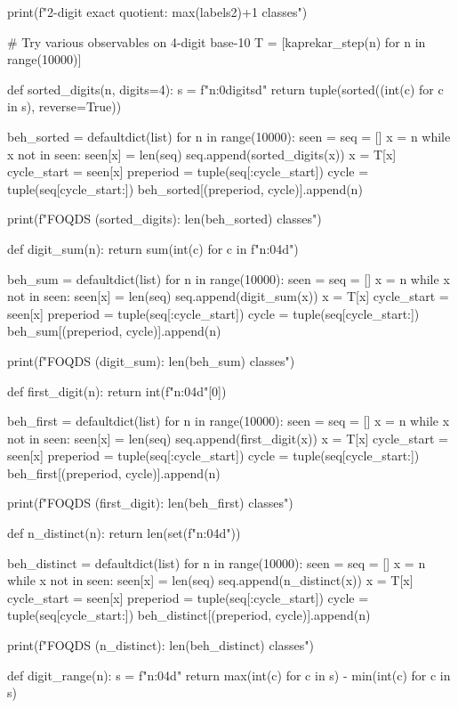 {{{{{{{{{{{{{print(f"2-digit exact quotient: {max(labels2)+1} classes")

# Try various observables on 4-digit base-10
T = [kaprekar_step(n) for n in range(10000)]

def sorted_digits(n, digits=4):
    s = f"{n:0{digits}d}"
    return tuple(sorted((int(c) for c in s), reverse=True))

beh_sorted = defaultdict(list)
for n in range(10000):
    seen = {}
    seq = []
    x = n
    while x not in seen:
        seen[x] = len(seq)
        seq.append(sorted_digits(x))
        x = T[x]
    cycle_start = seen[x]
    preperiod = tuple(seq[:cycle_start])
    cycle = tuple(seq[cycle_start:])
    beh_sorted[(preperiod, cycle)].append(n)

print(f"FOQDS (sorted_digits): {len(beh_sorted)} classes")

def digit_sum(n):
    return sum(int(c) for c in f"{n:04d}")

beh_sum = defaultdict(list)
for n in range(10000):
    seen = {}
    seq = []
    x = n
    while x not in seen:
        seen[x] = len(seq)
        seq.append(digit_sum(x))
        x = T[x]
    cycle_start = seen[x]
    preperiod = tuple(seq[:cycle_start])
    cycle = tuple(seq[cycle_start:])
    beh_sum[(preperiod, cycle)].append(n)

print(f"FOQDS (digit_sum): {len(beh_sum)} classes")

def first_digit(n):
    return int(f"{n:04d}"[0])

beh_first = defaultdict(list)
for n in range(10000):
    seen = {}
    seq = []
    x = n
    while x not in seen:
        seen[x] = len(seq)
        seq.append(first_digit(x))
        x = T[x]
    cycle_start = seen[x]
    preperiod = tuple(seq[:cycle_start])
    cycle = tuple(seq[cycle_start:])
    beh_first[(preperiod, cycle)].append(n)

print(f"FOQDS (first_digit): {len(beh_first)} classes")

def n_distinct(n):
    return len(set(f"{n:04d}"))

beh_distinct = defaultdict(list)
for n in range(10000):
    seen = {}
    seq = []
    x = n
    while x not in seen:
        seen[x] = len(seq)
        seq.append(n_distinct(x))
        x = T[x]
    cycle_start = seen[x]
    preperiod = tuple(seq[:cycle_start])
    cycle = tuple(seq[cycle_start:])
    beh_distinct[(preperiod, cycle)].append(n)

print(f"FOQDS (n_distinct): {len(beh_distinct)} classes")

def digit_range(n):
    s = f"{n:04d}"
    return max(int(c) for c in s) - min(int(c) for c in s)

}}}}}}}}}}}}}
